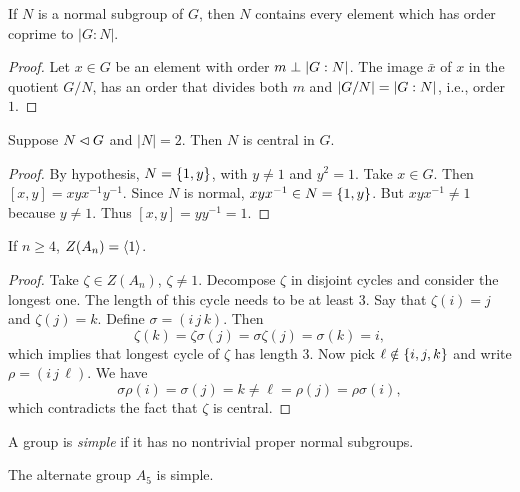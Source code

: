 \begin{lem}\label{order-perp-index}
    If\/ $N$ is a normal subgroup of\/ $G$, then $N$ contains every element which has order coprime to $|G:N|$.
\end{lem}

\begin{proof} Let $x\in G$ be an element with order $m\perp\left\vert{G:N}\right\vert$. The image $\bar x$ of $x$ in the quotient $G/N$, has an order that divides both $m$ and $\left\vert{G/N}\right\vert=\left\vert{G:N}\right\vert$, i.e., order~$1$.  \end{proof}

\begin{lem}\label{normal-order2}
    Suppose $N\lhd G$ and $|N| = 2$. Then $N$ is central in $G$.
\end{lem}

\begin{proof} By hypothesis, $N=\{1,y\}$, with $y\ne1$ and $y^2=1$. Take $x\in G$. Then $[x,y]=xyx^{-1}y^{-1}$. Since $N$ is normal, $xyx^{-1}\in N=\{1,y\}$. But $xyx^{-1}\ne1$ because $y\ne1$. Thus $[x,y]=yy^{-1}=1$.  \end{proof}

\begin{lem}\label{Z(An)=1}
    If $n\ge4$, $Z(A_n)=\langle1\rangle$.
\end{lem}

\begin{proof} Take $\zeta\in Z(A_n)$, $\zeta\ne1$. Decompose $\zeta$ in disjoint cycles and consider the longest one. The length of this cycle needs to be at least $3$. Say that $\zeta(i)=j$ and $\zeta(j)=k$. Define $\sigma=(i\,j\,k)$. Then
$$
    \zeta(k)=\zeta\sigma(j)=\sigma\zeta(j)=\sigma(k)=i,
$$
which implies that longest cycle of $\zeta$ has length $3$. Now pick $\ell\notin\{i,j,k\}$ and write $\rho=(i\,j\,\ell)$. We have
$$
    \sigma\rho(i)=\sigma(j) = k \ne \ell = \rho(j)=\rho\sigma(i),
$$
which contradicts the fact that $\zeta$ is central.  \end{proof}

\begin{defn}
    A group is \textsl{simple} if it has no nontrivial proper normal subgroups.
\end{defn}

\begin{prop}\label{A_5-is-simple}
    The alternate group $A_5$ is simple.
\end{prop}

